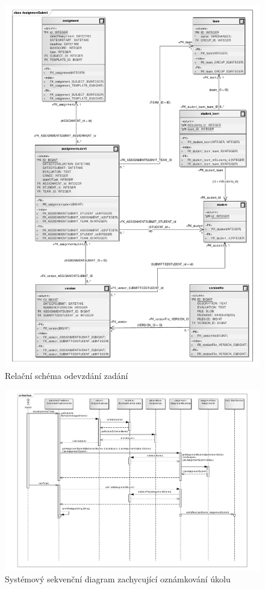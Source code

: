 \documentclass[11pt,twoside,a4paper]{book}
\begin{document}
\begin{figure}
\begin{center}
\includegraphics[width=\linewidth]{images/assignmentSubmitRelational}
\caption{Relační schéma odevzdání zadání}
\label{img:assignmnetSubmitRelation}
\end{center}
\end{figure}	

\begin{figure}
\begin{center}
\includegraphics[width=\linewidth]{images/sdRate}
\caption{Systémový sekvenční diagram zachycující oznámkování úkolu}  
\label{img:ssdRate}
\end{center}
\end{figure}
\end{document}
